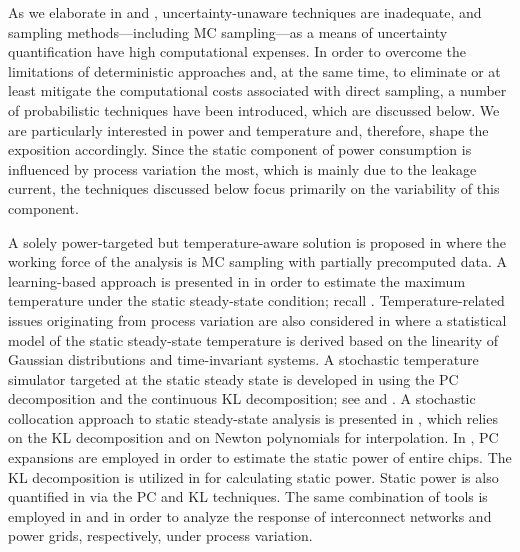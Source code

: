 As we elaborate in  and , uncertainty-unaware
techniques are inadequate, and sampling methods---including \ac{MC}
sampling---as a means of uncertainty quantification have high computational
expenses. In order to overcome the limitations of deterministic approaches and,
at the same time, to eliminate or at least mitigate the computational costs
associated with direct sampling, a number of probabilistic techniques have been
introduced, which are discussed below. We are particularly interested in power
and temperature and, therefore, shape the exposition accordingly. Since the
static component of power consumption is influenced by process variation the
most, which is mainly due to the leakage current, the techniques discussed below
focus primarily on the variability of this component.

A solely power-targeted but temperature-aware solution is proposed in
\cite{chandra2010} where the working force of the analysis is \ac{MC} sampling
with partially precomputed data. A learning-based approach is presented in
\cite{juan2011} in order to estimate the maximum temperature under the static
steady-state condition; recall .
Temperature-related issues originating from process variation are also
considered in \cite{juan2012} where a statistical model of the static
steady-state temperature is derived based on the linearity of Gaussian
distributions and time-invariant systems. A stochastic temperature simulator
targeted at the static steady state is developed in \cite{huang2009a} using the
\ac{PC} decomposition and the continuous \ac{KL} decomposition; see
 and . A stochastic
collocation \cite{maitre2010, xiu2010} approach to static steady-state analysis
is presented in \cite{lee2013}, which relies on the \ac{KL} decomposition and on
Newton polynomials for interpolation. In \cite{shen2009}, \ac{PC} expansions are
employed in order to estimate the static power of entire chips. The \ac{KL}
decomposition is utilized in \cite{bhardwaj2006} for calculating static power.
Static power is also quantified in \cite{bhardwaj2008} via the \ac{PC} and
\ac{KL} techniques. The same combination of tools is employed in
\cite{vrudhula2006} and \cite{ghanta2006} in order to analyze the response of
interconnect networks and power grids, respectively, under process variation.


